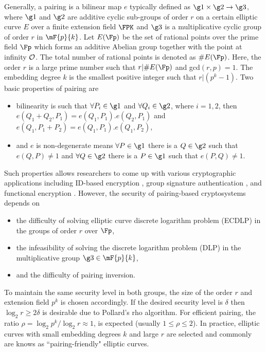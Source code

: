 Generally, a pairing is a bilinear map $e$ typically defined as  $\g1 \times \g2 \to \g3$, where $\g1$ and $\g2$ are additive cyclic sub-groups of  order $r$  on a certain elliptic curve $E$ over a finite extension field $\FPK$ and $\g3$ is a multiplicative cyclic group of order $r$ in $\mF{p}{k}$.
Let $E(\Fp)$ be the set of rational points over the prime field $\Fp$ which forms an additive Abelian group together with the point at infinity $\cal{O}$. The total number of rational points is denoted as $\#E(\Fp)$. Here, the order $r$ is a large prime number such that $r | \#E(\Fp)$ and gcd$(r,p)=1$. The embedding degree $k$ is the smallest positive integer such that $r | (p^k -1)$.
 Two basic properties of pairing are
 \begin{itemize}
 \item bilinearity is such that $\forall P_i \in \g1$ and $\forall Q_i \in \g2$, where $i= 1, 2$, then $e(Q_1+Q_2,P_1) = e(Q_1,P_1). e(Q_2,P_1)$ and $e(Q_1,P_1+P_2) = e(Q_1,P_1). e(Q_1,P_2)$,
 \item and $e$ is non-degenerate means $\forall P \in \g1$ there is a $Q \in \g2$ such that  $e(Q,P) \neq 1$ and $\forall Q \in \g2$ there is a $P \in \g1$ such that $e(P,Q) \neq 1$.
 \end{itemize}
Such properties allows researchers to come up with various cryptographic applications including ID-based encryption \cite{C:BonFra01}, group signature authentication \cite{C:BonBoySha04}, and functional encryption \cite{C:OkaTak10}.  However, the security of pairing-based cryptosystems depends  on 
\begin{itemize}
\item  the difficulty of solving elliptic curve discrete logarithm problem (ECDLP) in the groups of order $r$ over $\Fp$,
\item  the infeasibility of solving the discrete logarithm problem (DLP) in the multiplicative group $\g3 \in \mF{p}{k}$,
\item and the difficulty of pairing inversion.
\end{itemize}
To maintain the same security level in both groups, the size of the order $r$ and extension field $p^k$ is chosen accordingly. If the desired security level is $\delta$ then $\log_2 r  \geq 2\delta$ is desirable due to Pollard's rho algorithm.  For efficient pairing, the ratio $\rho = \log_2 p^k/ \log_2 r \approx 1$,   is expected (usually  $1\leq  \rho  \leq 2$). In practice, elliptic curves with small embedding degrees $k$ and large $r$ are selected and commonly are knows as ``pairing-friendly" elliptic curves.

